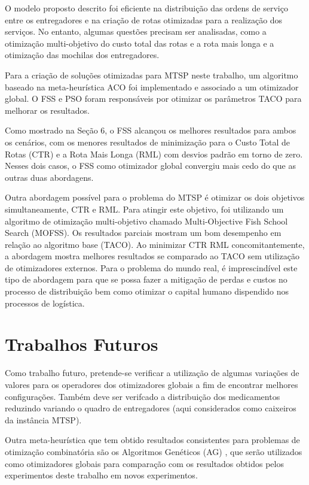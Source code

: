 O modelo proposto descrito foi eficiente na distribuição das ordens de serviço entre os entregadores e na criação de rotas otimizadas para a realização dos serviços. No entanto, algumas questões precisam ser analisadas, como a otimização multi-objetivo do custo total das rotas e a rota mais longa e a otimização das mochilas dos entregadores.

Para a criação de soluções otimizadas para MTSP neste trabalho, um algoritmo baseado na meta-heurística ACO foi implementado e associado a um otimizador global. O FSS e PSO foram responsáveis por otimizar os parâmetros TACO para melhorar os resultados.

Como mostrado na Seção 6, o FSS alcançou os melhores resultados para ambos os cenários, com os menores resultados de minimização para o Custo Total de Rotas (CTR) e a Rota Mais Longa (RML) com desvios padrão em torno de zero. Nesses dois casos, o FSS como otimizador global convergiu mais cedo do que as outras duas abordagens.

Outra abordagem possível para o problema do MTSP é otimizar os dois objetivos simultaneamente, CTR e RML. Para atingir este objetivo, foi utilizando um algoritmo de otimização multi-objetivo chamado Multi-Objective Fish School Search (MOFSS). Os resultados parciais mostram um bom desempenho em relação ao algoritmo base (TACO). Ao minimizar CTR RML concomitantemente, a abordagem mostra melhores resultados se comparado ao TACO sem utilização de otimizadores externos. Para o problema do mundo real, é imprescindível este tipo de abordagem para que se possa fazer a mitigação de perdas e custos no processo de distribuição bem como otimizar o capital humano dispendido nos processos de logística.

\section{Trabalhos Futuros}

Como trabalho futuro, pretende-se verificar a utilização de algumas variações de valores para os operadores dos otimizadores globais a fim de encontrar melhores configurações. Também deve ser verifcado a distribuição dos medicamentos reduzindo variando o quadro de entregadores (aqui considerados como caixeiros da instância MTSP).

Outra meta-heurística que tem obtido resultados consistentes para problemas de otimização combinatória são os Algoritmos Genéticos (AG) \cite{somhom1999competition}, que serão utilizados como otimizadores globais para comparação com os resultados obtidos pelos experimentos deste trabalho em novos experimentos.

